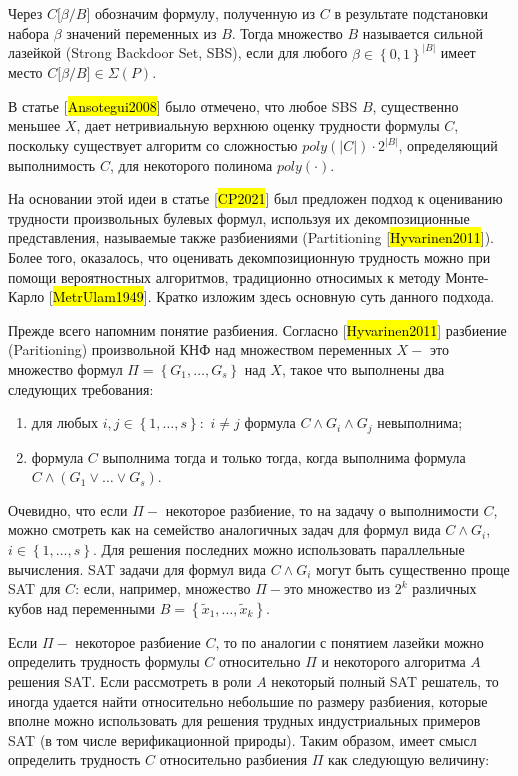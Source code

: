 Через $C\lbrack\beta/B\rbrack$ обозначим формулу, полученную из $C$ в результате подстановки набора $\beta$ значений переменных из $B$. Тогда множество $B$ называется сильной лазейкой (Strong Backdoor Set, SBS), если для любого $\beta \in \left\{ 0,1 \right\}^{|B|}$ имеет место $C\lbrack\beta/B\rbrack \in \Sigma(P)$.

В статье {[}\hl{Ansotegui2008}{]} было отмечено, что любое SBS $B$, существенно меньшее $X$, дает нетривиальную верхнюю оценку трудности формулы $C$, поскольку существует алгоритм со сложностью $poly\left( |C| \right) \cdot 2^{|B|}$, определяющий выполнимость $C$, для некоторого полинома $poly( \cdot )$.

На основании этой идеи в статье {[}\hl{CP2021}{]} был предложен подход к оцениванию трудности произвольных булевых формул, используя их декомпозиционные представления, называемые также разбиениями (Partitioning {[}\hl{Hyvarinen2011}{]}). Более того, оказалось, что оценивать декомпозиционную трудность можно при помощи вероятностных алгоритмов, традиционно относимых к методу Монте-Карло {[}\hl{MetrUlam1949}{]}. Кратко изложим здесь основную суть данного подхода.

Прежде всего напомним понятие разбиения. Согласно {[}\hl{Hyvarinen2011}{]} разбиение (Paritioning) произвольной КНФ над множеством переменных $X -$ это множество формул $\Pi = \left\{ G_{1},\ldots,G_{s} \right\}$ над $X$, такое что выполнены два следующих требования:

\begin{enumerate}
\def\labelenumi{\arabic{enumi}.}
\item
  для любых $i,j \in \left\{ 1,\ldots,s \right\}:$ $i \neq j$ формула $C \land G_{i} \land G_{j}$ невыполнима;
\item
  формула $C$ выполнима тогда и только тогда, когда выполнима формула $C \land \left( G_{1} \lor \ldots \lor G_{s} \right)$.
\end{enumerate}

Очевидно, что если $\Pi -$ некоторое разбиение, то на задачу о выполнимости $C$, можно смотреть как на семейство аналогичных задач для формул вида $C \land G_{i}$, $i \in \left\{ 1,\ldots,s \right\}$. Для решения последних можно использовать параллельные вычисления. SAT задачи для формул вида $C \land G_{i}$ могут быть существенно проще SAT для $C$: если, например, множество $\Pi -$это множество из $2^{k}$ различных кубов над переменными $B = \left\{ {\widetilde{x}}_{1},\ldots,{\widetilde{x}}_{k} \right\}$.

Если $\Pi -$ некоторое разбиение $C$, то по аналогии с понятием лазейки можно определить трудность формулы $C$ относительно $\Pi$ и некоторого алгоритма $A$ решения SAT. Если рассмотреть в роли $A$ некоторый полный SAT решатель, то иногда удается найти относительно небольшие по размеру разбиения, которые вполне можно использовать для решения трудных индустриальных примеров SAT (в том числе верификационной природы). Таким образом, имеет смысл определить трудность $C$ относительно разбиения $\Pi$ как следующую величину:

